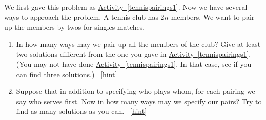 \documentclass{book}
\begin{document}
\setcounter{project}{112}
\addtocounter{project}{-1}
\begin{activity}[]\label{tennispairings2}
\hypertarget{p-810}{}%
We first gave this problem as \hyperref[tennispairings1]{Activity~\ref{tennispairings1}}. Now we have several ways to approach the problem. A tennis club has \(2n\) members. We want to pair up the members by twos for singles matches.%
\begin{enumerate}[font=\bfseries,label=(\alph*),ref=\alph*]
\item\label{task-148} \hypertarget{p-811}{}%
In how many ways may we pair up all the members of the club? Give at least two solutions different from the one you gave in   \hyperref[tennispairings1]{Activity~\ref{tennispairings1}}. (You may not have done \hyperref[tennispairings1]{Activity~\ref{tennispairings1}}. In that case, see if you can find three solutions.)%
~\hfill{\tiny\hyperlink{a-112.a}{[hint]}\hypertarget{q-112.a}{}}\item\label{task-149} \hypertarget{p-815}{}%
Suppose that in addition to specifying who plays whom, for each pairing we say who serves first.  Now in how many ways may we specify our pairs? Try to find as many solutions as you can.%
~\hfill{\tiny\hyperlink{a-112.b}{[hint]}\hypertarget{q-112.b}{}}\end{enumerate}
\end{activity}
\end{document}
